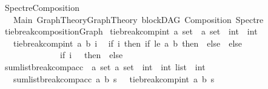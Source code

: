 %
\begin{isabellebody}%
%
%
\isadelimtheory
%
\endisadelimtheory
%
\isatagtheory
{}\isamarkupfalse%
\ SpectreComposition\ \ \ \ \ \ \ \ \ \ \ \ \ \ \ \ \ \ \ \ \ \ \ \ \ \ \ \ \ \isanewline
\ \ \ Main\ Graph{\isacharunderscore}{\kern0pt}Theory{\isachardot}{\kern0pt}Graph{\isacharunderscore}{\kern0pt}Theory\ blockDAG\ Composition\ Spectre\isanewline
{}%
\endisatagtheory
{\isafoldtheory}%
%
\isadelimtheory
\isanewline
%
\endisadelimtheory
\isanewline
{}\isamarkupfalse%
\ tie{\isacharunderscore}{\kern0pt}break{\isacharunderscore}{\kern0pt}compositionGraph\isanewline
{}\isanewline
\isanewline
\isanewline
{}\isamarkupfalse%
\ tie{\isacharunderscore}{\kern0pt}break{\isacharunderscore}{\kern0pt}comp{\isacharunderscore}{\kern0pt}int{\isacharcolon}{\kern0pt}{\isacharcolon}{\kern0pt}\ {\isachardoublequoteopen}{\isacharprime}{\kern0pt}a\ set\ {\isasymRightarrow}\ {\isacharprime}{\kern0pt}a\ set\ {\isasymRightarrow}\ int\ {\isasymRightarrow}\ int{\isachardoublequoteclose}\isanewline
\ \ \ {\isachardoublequoteopen}tie{\isacharunderscore}{\kern0pt}break{\isacharunderscore}{\kern0pt}comp{\isacharunderscore}{\kern0pt}int\ a\ b\ i\ {\isacharequal}{\kern0pt}\isanewline
\ {\isacharparenleft}{\kern0pt}if\ i{\isacharequal}{\kern0pt}{}\ then\ {\isacharparenleft}{\kern0pt}if\ {\isacharparenleft}{\kern0pt}le\ a\ b{\isacharparenright}{\kern0pt}\ then\ {}\ else\ {\isacharminus}{\kern0pt}{}{\isacharparenright}{\kern0pt}\ else\ \isanewline
\ \ \ \ \ \ \ \ \ \ \ \ \ \ {\isacharparenleft}{\kern0pt}if\ i\ {\isachargreater}{\kern0pt}\ {}\ then\ {}\ else\ {\isacharminus}{\kern0pt}{}{\isacharparenright}{\kern0pt}{\isacharparenright}{\kern0pt}{\isachardoublequoteclose}\isanewline
\isanewline
{}\isamarkupfalse%
\ sumlist{\isacharunderscore}{\kern0pt}break{\isacharunderscore}{\kern0pt}comp{\isacharunderscore}{\kern0pt}acc\ {\isacharcolon}{\kern0pt}{\isacharcolon}{\kern0pt}\ {\isachardoublequoteopen}{\isacharprime}{\kern0pt}a\ set\ {\isasymRightarrow}{\isacharprime}{\kern0pt}a\ set\ {\isasymRightarrow}\ int\ {\isasymRightarrow}\ int\ list\ {\isasymRightarrow}\ int{\isachardoublequoteclose}\isanewline
\ \ \ {\isachardoublequoteopen}sumlist{\isacharunderscore}{\kern0pt}break{\isacharunderscore}{\kern0pt}comp{\isacharunderscore}{\kern0pt}acc\ a\ b\ s\ {\isacharbrackleft}{\kern0pt}{\isacharbrackright}{\kern0pt}\ {\isacharequal}{\kern0pt}\ tie{\isacharunderscore}{\kern0pt}break{\isacharunderscore}{\kern0pt}comp{\isacharunderscore}{\kern0pt}int\ a\ b\ s{\isachardoublequoteclose}\isanewline

\end{isabellebody}
